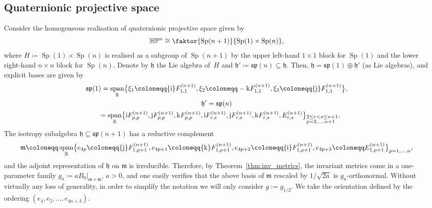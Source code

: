 \documentclass[pdftex]{sigma}
\numberwithin{equation}{section}
\DeclareMathOperator{\vecspan}{span}
\DeclareMathOperator{\Sp}{Sp}
\begin{document}
		\subsection{Quaternionic projective space}
		
		Consider the homogeneous realisation of quaternionic projective space given by
		\[
		\mathbb{HP}^{n} \cong \faktor{\Sp(n+1)}{ \Sp(1) \times \Sp(n) } ,
		\]
		where $H \coloneqq \Sp(1) \times \Sp(n)$ is realised as a subgroup of $\Sp(n+1)$ by the upper left-hand $1 \times 1$ block for $\Sp(1)$ and the lower right-hand $n \times n$ block for $\Sp(n)$. Denote by $\mathfrak{h}$ the Lie algebra of~$H$ and $\mathfrak{h}' \coloneqq \mathfrak{sp}(n) \subseteq \mathfrak{h}$. Then,
$
			\mathfrak{h} = \mathfrak{sp}(1) \oplus \mathfrak{h}' $ (as Lie algebras),
		and explicit bases are given by
		\begin{gather*}
			\mathfrak{sp}(1) = \vecspan_{\mathbb{R}}\bigl\{ \xi_1 \coloneqq {\rm i} F_{1,1}^{(n+1)}, \xi_2 \coloneqq -{\rm k} F_{1,1}^{(n+1)}, \xi_3 \coloneqq {\rm j} F_{1,1}^{(n+1)} \bigr\} ,\\
			\mathfrak{h}' = \mathfrak{sp}(n) \\
\phantom{\mathfrak{h}' }{}= \vecspan_{\mathbb{R}} \bigl\{ {\rm i} F_{p,p}^{(n+1)}, {\rm j} F_{p,p}^{(n+1)}, {\rm k} F_{p,p}^{(n+1)}, {\rm i} F_{r,s}^{(n+1)}, {\rm j} F_{r,s}^{(n+1)}, {\rm k} F_{r,s}^{(n+1)}, E_{r,s}^{(n+1)} \bigr\}_{\begin{subarray}{l} 2 \leq r < s \leq n+1 \\ p = 2 , \dots, n+1 \end{subarray}} .
		\end{gather*}
		The isotropy subalgebra $\mathfrak{h} \subseteq \mathfrak{sp}(n+1)$ has a reductive complement
		\begin{equation*}
			\mathfrak{m} \coloneqq \vecspan_{\mathbb{R}} \bigl\{e_{4p} \coloneqq {\rm j} F_{1,p+1}^{(n+1)}, e_{4p+1} \coloneqq {\rm k} F_{1,p+1}^{(n+1)}, e_{4p+2} \coloneqq {\rm i} F_{1,p+1}^{(n+1)}, e_{4p+3} \coloneqq E_{1,p+1}^{(n+1)}\bigr\}_{p = 1, \dots, n} ,
		\end{equation*}
		and the adjoint representation of $\mathfrak{h}$ on $\mathfrak{m}$ is irreducible. Therefore, by Theorem~\ref{thm:inv_metrics}, the invariant metrics come in a one-parameter family
		$
		g_a \coloneqq a B_0 \rvert_{\mathfrak{m} \times \mathfrak{m}}$, $ a>0$,
		and one easily verifies that the above basis of $\mathfrak{m}$ rescaled by $1/\sqrt{2a}$ is $g_a$-orthonormal. Without virtually any loss of generality, in order to simplify the notation we will only consider $g:= g_{1/2}$. We take the orientation defined by the ordering $(e_4,e_5,\dots,e_{4n+3})$.
		
\end{document}
